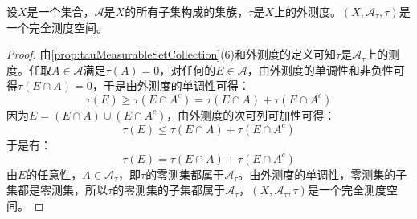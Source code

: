 \begin{theorem}
	设$X$是一个集合，$\mathscr{A}$是$X$的所有子集构成的集族，$\tau$是$X$上的外测度。$(X,\mathscr{A}_{\tau},\tau)$是一个完全测度空间。
\end{theorem}
\begin{proof}
	由\cref{prop:tauMeasurableSetCollection}(6)和外测度的定义可知$\tau$是$\mathscr{A}_{\tau}$上的测度。任取$A\in \mathscr{A}$满足$\tau(A)=0$，对任何的$E\in \mathscr{A}$，由外测度的单调性和非负性可得$\tau(E\cap A)=0$，于是由外测度的单调性可得：
	\begin{equation*}
		\tau(E)\geqslant\tau(E\cap A^c)=\tau(E\cap A)+\tau(E\cap A^c)
	\end{equation*}
	因为$E=(E\cap A)\cup(E\cap A^c)$，由外测度的次可列可加性可得：
	\begin{equation*}
		\tau(E)\leqslant\tau(E\cap A)+\tau(E\cap A^c)
	\end{equation*}
	于是有：
	\begin{equation*}
		\tau(E)=\tau(E\cap A)+\tau(E\cap A^c)
	\end{equation*}
	由$E$的任意性，$A\in \mathscr{A}_{\tau}$，即$\tau$的零测集都属于$\mathscr{A}_{\tau}$。由外测度的单调性，零测集的子集都是零测集，所以$\tau$的零测集的子集都属于$\mathscr{A}_{\tau}$，$(X,\mathscr{A}_{\tau},\tau)$是一个完全测度空间。
\end{proof}

